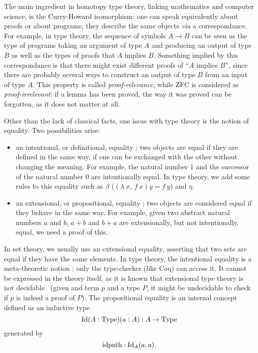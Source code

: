 The main ingredient in homotopy type theory, linking mathematics and
computer science, is the Curry-Howard isomorphism: one can speak
equivalently about proofs or about programs, they describe the same
objects {\em via} a correspondance. For example, in type theory, the
sequence of symbols $A\to B$ can be seen as the type of programs
taking an argument of type $A$ and producing an output of type $B$ as
well as the types of proofs that $A$ implies $B$. Something implied by
this correspondance is that there might exist different proofs of
``$A$ implies $B$'', since there are probably several ways to
construct an output of type $B$ from an input of type $A$. This
property is called {\em proof-relevance}, while ZFC is considered as
{\em proof-irrelevant}: if a lemma has been proved, the way it was
proved can be forgotten, as it does not matter at all.

Other than the lack of classical facts, one issue with type theory is
the notion of equality. Two possibilities arise:
\begin{itemize}
\item an intentional, or definitional, equality ; two objects are
  equal if they are defined in the same way, \ie{} if one can be
  exchanged with the other without changing the meaning. For example,
  the natural number 1 and the successor of the natural number 0 are
  intentionally equal. In type theory, we add some rules to this
  equality such as $\beta$ ($(\lambda\ x,\,f\ x)y = f\ y$) and $\eta$.
\item an extensional, or propositional, equality ; two objects are
  considered equal if they behave in the same way. For example, given
  two abstract natural numbers $a$ and $b$, $a+b$ and $b+a$ are
  extensionally, but not intentionally, equal, \ie{} we need a proof
  of this.
\end{itemize}
In set theory, we usually use an extensional equality, asserting that
two sets are equal if they have the same elements. In type theory, the
intentional equality is a meta-theoretic notion ; only the
type-checker (like Coq) can access it. It cannot be expressed in the
theory itself, as it is known that extensional type theory is not
decidable~\cite{hofmann1995extensional} (given and term $p$ and a type
$P$, it might be undecidable to check if $p$ is indeed a proof of
$P$). The propositional equality is an internal concept defined as an inductive type 
\[    \mathrm{Id} (A:\operatorname{Type}) (a:A) : A \to \operatorname{Type} 
\]
generated by
\[
    \mathrm{idpath} : \mathrm{Id}_A(a,a).
\]

